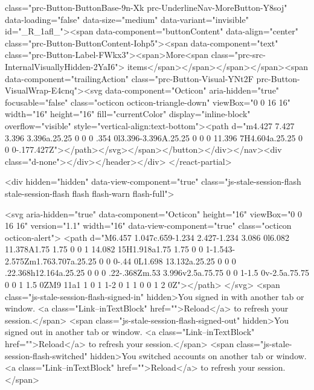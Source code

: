{{{class="prc-Button-ButtonBase-9n-Xk prc-UnderlineNav-MoreButton-Y8soj" data-loading="false" data-size="medium" data-variant="invisible" id="_R_1afl_"><span data-component="buttonContent" data-align="center" class="prc-Button-ButtonContent-Iohp5"><span data-component="text" class="prc-Button-Label-FWkx3"><span>More<span class="prc-src-InternalVisuallyHidden-2YaI6"> items</span></span></span></span><span data-component="trailingAction" class="prc-Button-Visual-YNt2F prc-Button-VisualWrap-E4cnq"><svg data-component="Octicon" aria-hidden="true" focusable="false" class="octicon octicon-triangle-down" viewBox="0 0 16 16" width="16" height="16" fill="currentColor" display="inline-block" overflow="visible" style="vertical-align:text-bottom"><path d="m4.427 7.427 3.396 3.396a.25.25 0 0 0 .354 0l3.396-3.396A.25.25 0 0 0 11.396 7H4.604a.25.25 0 0 0-.177.427Z"></path></svg></span></button></div></nav><div class="d-none"></div></header></div>
</react-partial>




      <div hidden="hidden" data-view-component="true" class="js-stale-session-flash stale-session-flash flash flash-warn flash-full">
  
        <svg aria-hidden="true" data-component="Octicon" height="16" viewBox="0 0 16 16" version="1.1" width="16" data-view-component="true" class="octicon octicon-alert">
    <path d="M6.457 1.047c.659-1.234 2.427-1.234 3.086 0l6.082 11.378A1.75 1.75 0 0 1 14.082 15H1.918a1.75 1.75 0 0 1-1.543-2.575Zm1.763.707a.25.25 0 0 0-.44 0L1.698 13.132a.25.25 0 0 0 .22.368h12.164a.25.25 0 0 0 .22-.368Zm.53 3.996v2.5a.75.75 0 0 1-1.5 0v-2.5a.75.75 0 0 1 1.5 0ZM9 11a1 1 0 1 1-2 0 1 1 0 0 1 2 0Z"></path>
</svg>
        <span class="js-stale-session-flash-signed-in" hidden>You signed in with another tab or window. <a class="Link--inTextBlock" href="">Reload</a> to refresh your session.</span>
        <span class="js-stale-session-flash-signed-out" hidden>You signed out in another tab or window. <a class="Link--inTextBlock" href="">Reload</a> to refresh your session.</span>
        <span class="js-stale-session-flash-switched" hidden>You switched accounts on another tab or window. <a class="Link--inTextBlock" href="">Reload</a> to refresh your session.</span>

}}}
